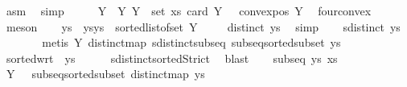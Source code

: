 \begin{isabellebody}
\ asm\ \isamarkupfalse%
\ simp\isanewline
\ \ \isamarkupfalse%
\ \isamarkupfalse%
\ Y\ \ Y{\isacharcolon}{\kern0pt}\ {\isachardoublequoteopen}Y\ {\isasymsubseteq}\ {\isacharparenleft}{\kern0pt}set\ xs{\isacharparenright}{\kern0pt}{\isachardoublequoteclose}\ {\isachardoublequoteopen}card\ Y\ {\isasymle}\ {}{\isachardoublequoteclose}\ {\isachardoublequoteopen}{\isasymnot}convex{\isacharunderscore}{\kern0pt}pos\ Y{\isachardoublequoteclose}\ \isamarkupfalse%
\ fourconvex\ \isamarkupfalse%
\ meson\isanewline
\ \ \isamarkupfalse%
\ ys\ \ ys{\isacharcolon}{\kern0pt}{\isachardoublequoteopen}ys\ {\isacharequal}{\kern0pt}\ sorted{\isacharunderscore}{\kern0pt}list{\isacharunderscore}{\kern0pt}of{\isacharunderscore}{\kern0pt}set\ Y{\isachardoublequoteclose}\isanewline
\ \ \isamarkupfalse%
\ {}{}{\isacharcolon}{\kern0pt}\ {\isachardoublequoteopen}distinct\ ys{\isachardoublequoteclose}\ \isamarkupfalse%
\ simp\isanewline
\ \ \isamarkupfalse%
\ {}{\isacharcolon}{\kern0pt}{\isachardoublequoteopen}sdistinct\ ys{\isachardoublequoteclose}\ \isamarkupfalse%
\ {}\isanewline
\ \ \ \ \isamarkupfalse%
\ {\isacharparenleft}{\kern0pt}metis\ Y{\isacharparenleft}{\kern0pt}{}{\isacharparenright}{\kern0pt}\ distinct{\isacharunderscore}{\kern0pt}map\ sdistinct{\isacharunderscore}{\kern0pt}subseq\ subseq{\isacharunderscore}{\kern0pt}sorted{\isacharunderscore}{\kern0pt}subset\ ys{\isacharparenright}{\kern0pt}\ \isanewline
\ \ \isamarkupfalse%
\ {}{}{\isacharcolon}{\kern0pt}{\isachardoublequoteopen}sorted{\isacharunderscore}{\kern0pt}wrt\ {\isacharparenleft}{\kern0pt}{\isacharless}{\kern0pt}{\isacharparenright}{\kern0pt}\ ys{\isachardoublequoteclose}\isanewline
\ \ \ \ \isamarkupfalse%
\ sdistinct{\isacharunderscore}{\kern0pt}sortedStrict\ \isamarkupfalse%
\ blast\isanewline
\ \ \isamarkupfalse%
\ {}{\isacharcolon}{\kern0pt}{\isachardoublequoteopen}subseq\ ys\ xs{\isachardoublequoteclose}\ \isamarkupfalse%
\ Y{\isacharparenleft}{\kern0pt}{}{\isacharparenright}{\kern0pt}\ {}\ {}\ subseq{\isacharunderscore}{\kern0pt}sorted{\isacharunderscore}{\kern0pt}subset\ distinct{\isacharunderscore}{\kern0pt}map\ ys\ \isamarkupfalse%

\end{isabellebody}
